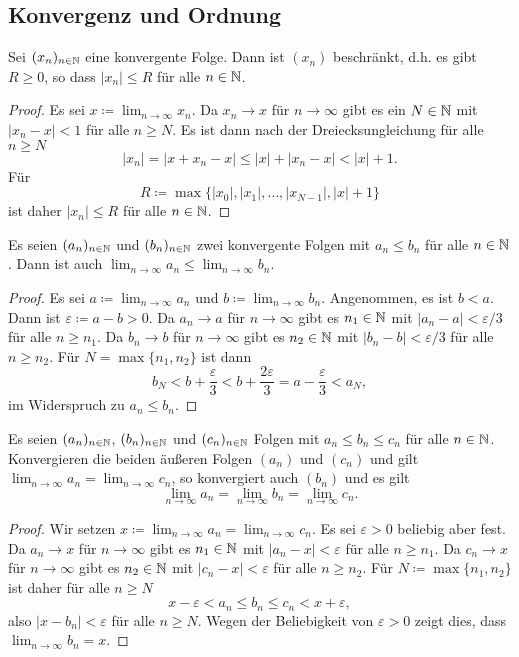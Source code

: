 \documentclass[a4paper,10pt]{article}
\begin{document}
\subsection{Konvergenz und Ordnung}


\begin{lem}
 Sei $(x_n)_{n \in \mathbb{N}}$ eine konvergente Folge. Dann ist $(x_n)$ beschränkt, d.h. es gibt $R \geq 0$, so dass $|x_n| \leq R$ für alle $n \in \mathbb{N}$.
\end{lem}
\begin{proof}
 Es sei $x \coloneqq \lim_{n \to \infty} x_n$. Da $x_n \to x$ für $n \to \infty$ gibt es ein $N \in \mathbb{N}$ mit $|x_n - x| < 1$ für alle $n \geq N$. Es ist dann nach der Dreiecksungleichung für alle $n \geq N$
 \[
  |x_n|
  = |x + x_n - x|
  \leq |x| + |x_n - x|
  < |x| + 1.
 \]
 Für
 \[
  R \coloneqq \max \{|x_0|, |x_1|, \dotsc, |x_{N-1}|, |x| + 1\}
 \]
 ist daher $|x_n| \leq R$ für alle $n \in \mathbb{N}$.
\end{proof}


\begin{lem}\label{lem: Konvergenz erhält Monotonie}
 Es seien $(a_n)_{n \in \mathbb{N}}$ und $(b_n)_{n \in \mathbb{N}}$ zwei konvergente Folgen mit $a_n \leq b_n$ für alle $n \in \mathbb{N}$. Dann ist auch $\lim_{n \to \infty} a_n \leq \lim_{n \to \infty} b_n$.
\end{lem}
\begin{proof}
 Es sei $a \coloneqq \lim_{n \to \infty} a_n$ und $b \coloneqq \lim_{n \to \infty} b_n$. Angenommen, es ist $b < a$. Dann ist $\varepsilon \coloneqq a-b > 0$. Da $a_n \to a$ für $n \to \infty$ gibt es $n_1 \in \mathbb{N}$ mit $|a_n - a| < \varepsilon/3$ für alle $n \geq n_1$. Da $b_n \to b$ für $n \to \infty$ gibt es $n_2 \in \mathbb{N}$ mit $|b_n - b| < \varepsilon/3$ für alle $n \geq n_2$. Für $N = \max \{n_1, n_2\}$ ist dann
 \[
  b_N < b + \frac{\varepsilon}{3} < b + \frac{2\varepsilon}{3} = a - \frac{\varepsilon}{3} < a_N,
 \]
 im Widerspruch zu $a_n \leq b_n$.
\end{proof}


\begin{lem}
 Es seien $(a_n)_{n \in \mathbb{N}}$, $(b_n)_{n \in \mathbb{N}}$ und $(c_n)_{n \in \mathbb{N}}$ Folgen mit $a_n \leq b_n \leq c_n$ für alle $n \in \mathbb{N}$. Konvergieren die beiden äußeren Folgen $(a_n)$ und $(c_n)$ und gilt $\lim_{n \to \infty} a_n = \lim_{n \to \infty} c_n$, so konvergiert auch $(b_n)$ und es gilt
 \[
  \lim_{n \to \infty} a_n = \lim_{n \to \infty} b_n = \lim_{n \to \infty} c_n.
 \]
\end{lem}
\begin{proof}
 Wir setzen $x \coloneqq \lim_{n \to \infty} a_n = \lim_{n \to \infty} c_n$. Es sei $\varepsilon > 0$ beliebig aber fest. Da $a_n \to x$ für $n \to \infty$ gibt es $n_1 \in \mathbb{N}$ mit $|a_n - x| < \varepsilon$ für alle $n \geq n_1$. Da $c_n \to x$ für $n \to \infty$ gibt es $n_2 \in \mathbb{N}$ mit $|c_n - x| < \varepsilon$ für alle $n \geq n_2$. Für $N \coloneqq \max \{n_1, n_2\}$ ist daher für alle $n \geq N$
 \[
  x-\varepsilon < a_n \leq b_n \leq c_n < x+\varepsilon,
 \]
 also $|x - b_n| < \varepsilon$ für alle $n \geq N$. Wegen der Beliebigkeit von $\varepsilon > 0$ zeigt dies, dass $\lim_{n \to \infty} b_n = x$.
\end{proof}
\end{document}
